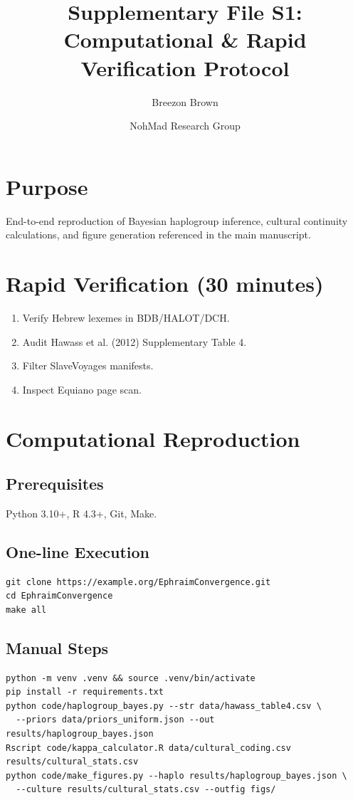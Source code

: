 \documentclass[11pt]{article}
\title{Supplementary File S1: Computational \& Rapid Verification Protocol}
\author{Breezon Brown \and NohMad Research Group} %
\date{}
\begin{document}
\maketitle
\doublespacing
\setlength{\emergencystretch}{2em} %

\section*{Purpose}
End-to-end reproduction of Bayesian haplogroup inference, cultural continuity calculations, and figure generation referenced in the main manuscript.

\section{Rapid Verification (30 minutes)}
\begin{enumerate}
  \item Verify Hebrew lexemes in BDB/HALOT/DCH.
  \item Audit Hawass et al. (2012) Supplementary Table 4.
  \item Filter SlaveVoyages manifests.
  \item Inspect Equiano page scan.
\end{enumerate}

\section{Computational Reproduction}
\subsection{Prerequisites}
Python 3.10+, R 4.3+, Git, Make.

\subsection{One-line Execution}
\begin{verbatim}
git clone https://example.org/EphraimConvergence.git
cd EphraimConvergence
make all
\end{verbatim}

\subsection{Manual Steps}
\begin{verbatim}
python -m venv .venv && source .venv/bin/activate
pip install -r requirements.txt
python code/haplogroup_bayes.py --str data/hawass_table4.csv \
  --priors data/priors_uniform.json --out results/haplogroup_bayes.json
Rscript code/kappa_calculator.R data/cultural_coding.csv results/cultural_stats.csv
python code/make_figures.py --haplo results/haplogroup_bayes.json \
  --culture results/cultural_stats.csv --outfig figs/
\end{verbatim}
\end{document}
